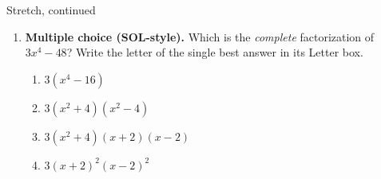 \documentclass[12pt]{article}
\begin{document}
\begin{notesbox}{Stretch, continued}
\begin{enumerate}[leftmargin=1.9em, itemsep=10pt, start=4]
  \item \textbf{Multiple choice (SOL-style).} Which is the \emph{complete} factorization of
        $3x^4-48$? Write the letter of the single best answer in its Letter box.
    \begin{enumerate}[label=(\Alph*), leftmargin=2.0em, itemsep=1pt]
      \item $3(x^4-16)$
      \item $3(x^2+4)(x^2-4)$
      \item $3(x^2+4)(x+2)(x-2)$
      \item $3(x+2)^2(x-2)^2$
    \end{enumerate}
\end{enumerate}
\end{notesbox}
\end{document}
